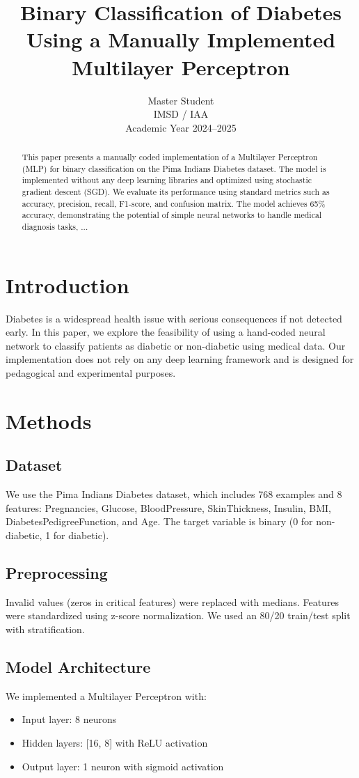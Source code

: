 \documentclass[12pt]{article}
\title{Binary Classification of Diabetes Using a Manually Implemented Multilayer Perceptron}
\author{Master Student \\ IMSD / IAA \\ Academic Year 2024--2025}
\date{}
\begin{document}
\maketitle

\begin{abstract}
This paper presents a manually coded implementation of a Multilayer Perceptron (MLP) for binary classification on the Pima Indians Diabetes dataset. The model is implemented without any deep learning libraries and optimized using stochastic gradient descent (SGD). We evaluate its performance using standard metrics such as accuracy, precision, recall, F1-score, and confusion matrix. The model achieves 65\% accuracy, demonstrating the potential of simple neural networks to handle medical diagnosis tasks, ...
\end{abstract}

\section{Introduction}
Diabetes is a widespread health issue with serious consequences if not detected early. In this paper, we explore the feasibility of using a hand-coded neural network to classify patients as diabetic or non-diabetic using medical data. Our implementation does not rely on any deep learning framework and is designed for pedagogical and experimental purposes.

\section{Methods}
\subsection{Dataset}
We use the Pima Indians Diabetes dataset, which includes 768 examples and 8 features: Pregnancies, Glucose, BloodPressure, SkinThickness, Insulin, BMI, DiabetesPedigreeFunction, and Age. The target variable is binary (0 for non-diabetic, 1 for diabetic).

\subsection{Preprocessing}
Invalid values (zeros in critical features) were replaced with medians. Features were standardized using z-score normalization. We used an 80/20 train/test split with stratification.

\subsection{Model Architecture}
We implemented a Multilayer Perceptron with:
\begin{itemize}
    \item Input layer: 8 neurons
    \item Hidden layers: [16, 8] with ReLU activation
    \item Output layer: 1 neuron with sigmoid activation
\end{itemize}
\end{document}

